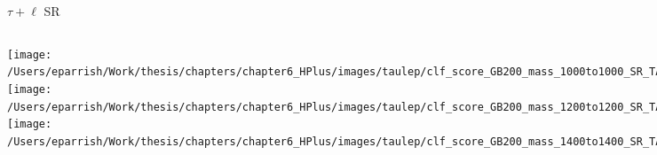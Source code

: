 \documentclass[aspectratio=169,xcolor=table]{beamer}
\begin{document}
    \begin{frame}[t]{$\tau+\ell$ SR}
      \begin{columns}[t]
          \texttt{[image: /Users/eparrish/Work/thesis/chapters/chapter6\_HPlus/images/taulep/clf\_score\_GB200\_mass\_1000to1000\_SR\_TAULEP.png]}
          \texttt{[image: /Users/eparrish/Work/thesis/chapters/chapter6\_HPlus/images/taulep/clf\_score\_GB200\_mass\_1200to1200\_SR\_TAULEP.png]}
          \texttt{[image: /Users/eparrish/Work/thesis/chapters/chapter6\_HPlus/images/taulep/clf\_score\_GB200\_mass\_1400to1400\_SR\_TAULEP.png]}

          \texttt{[image: /Users/eparrish/Work/thesis/chapters/chapter6\_HPlus/images/taulep/clf\_score\_GB200\_mass\_1600to1600\_SR\_TAULEP.png]}
          \texttt{[image: /Users/eparrish/Work/thesis/chapters/chapter6\_HPlus/images/taulep/clf\_score\_GB200\_mass\_1800to1800\_SR\_TAULEP.png]}
          \texttt{[image: /Users/eparrish/Work/thesis/chapters/chapter6\_HPlus/images/taulep/clf\_score\_GB200\_mass\_2000to2000\_SR\_TAULEP.png]}

          \texttt{[image: /Users/eparrish/Work/thesis/chapters/chapter6\_HPlus/images/taulep/clf\_score\_GB200\_mass\_2500to2500\_SR\_TAULEP.png]}
          \texttt{[image: /Users/eparrish/Work/thesis/chapters/chapter6\_HPlus/images/taulep/clf\_score\_GB200\_mass\_3000to3000\_SR\_TAULEP.png]}


      \end{columns}
    \end{frame}
\end{document}
